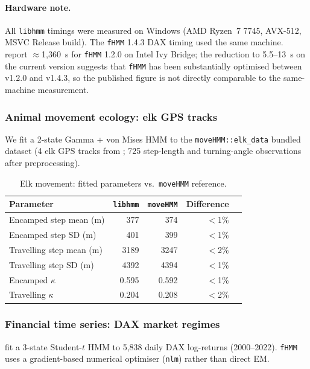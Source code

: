 \documentclass[11pt]{article}
\begin{document}
\paragraph{Hardware note.}
All \texttt{libhmm} timings were measured on Windows
(AMD Ryzen~7 7745, AVX-512, MSVC Release build).
The \texttt{fHMM} 1.4.3 DAX timing used the same machine.
\citet{Oelschlager2024} report $\approx$1{,}360~s for \texttt{fHMM} 1.2.0
on Intel Ivy Bridge; the reduction to 5.5--13~s on the current version suggests
that \texttt{fHMM} has been substantially optimised between v1.2.0 and v1.4.3,
so the published figure is not directly comparable to the same-machine measurement.

\subsubsection{Animal movement ecology: elk GPS tracks}
\label{sec:elk}

We fit a 2-state Gamma + von Mises HMM to the \texttt{moveHMM::elk\_data}
bundled dataset \citep{Michelot2016} (4 elk GPS tracks from \citet{Morales2004};
725 step-length and turning-angle observations after preprocessing).

\begin{table}[!ht]
\centering
\caption{Elk movement: fitted parameters vs.\ \texttt{moveHMM} reference.}
\label{tab:elk}
\begin{tabular}{lrrrr}
\toprule
Parameter & \texttt{libhmm} & \texttt{moveHMM} & Difference \\
\midrule
Encamped step mean (m)   & 377  & 374  & $<$1\% \\
Encamped step SD (m)     & 401  & 399  & $<$1\% \\
Travelling step mean (m) & 3189 & 3247 & $<$2\% \\
Travelling step SD (m)   & 4392 & 4394 & $<$1\% \\
Encamped $\kappa$        & 0.595 & 0.592 & $<$1\% \\
Travelling $\kappa$      & 0.204 & 0.208 & $<$2\% \\
\bottomrule
\end{tabular}
\end{table}

\subsubsection{Financial time series: DAX market regimes}
\label{sec:dax}

\citet{Oelschlager2024} fit a 3-state Student-$t$ HMM to
5,838 daily DAX log-returns (2000--2022).
\texttt{fHMM} uses a gradient-based numerical optimiser (\texttt{nlm})
rather than direct EM.
\end{document}
